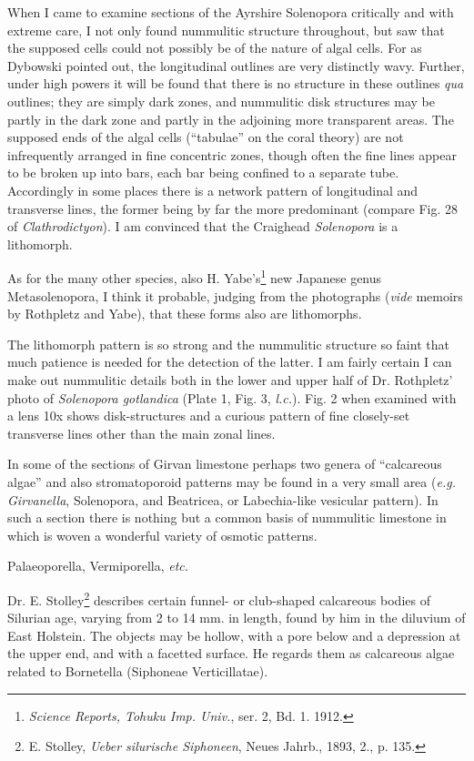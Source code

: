 \documentclass[a4paper, 12pt, oneside]{article}
\begin{document}
When I came to examine sections of the Ayrshire Solenopora critically and with extreme care, I not only found nummulitic structure throughout, but saw that the supposed cells could not possibly be of the nature of algal cells. For as Dybowski pointed out, the longitudinal outlines are very distinctly wavy. Further, under high powers it will be found that there is no structure in these outlines \emph{qua} outlines; they are simply dark zones, and nummulitic disk structures may be partly in the dark zone and partly in the adjoining more transparent areas. The supposed ends of the algal cells (``tabulae'' on the coral theory) are not infrequently arranged in fine concentric zones, though often the fine lines appear to be broken up into bars, each bar being confined to a separate tube. Accordingly in some places there is a network pattern of longitudinal and transverse lines, the former being by far the more predominant (compare Fig. 28 of \emph{Clathrodictyon}). I am convinced that the Craighead \emph{Solenopora} is a lithomorph.

As for the many other species, also H. Yabe's\footnote{\emph{Science Reports, Tohuku Imp. Univ.}, ser. 2, Bd. 1. 1912.} new Japanese genus Metasolenopora, I think it probable, judging from the photographs (\emph{vide} memoirs by Rothpletz and Yabe), that these forms also are lithomorphs.

The lithomorph pattern is so strong and the nummulitic structure so faint that much patience is needed for the detection of the latter. I am fairly certain I can make out nummulitic details both in the lower and upper half of Dr. Rothpletz' photo of \emph{Solenopora gotlandica} (Plate 1, Fig. 3, \emph{l.c.}). Fig. 2 when examined with a lens 10x shows disk-structures and a curious pattern of fine closely-set transverse lines other than the main zonal lines.

In some of the sections of Girvan limestone perhaps two genera of ``calcareous algae'' and also stromatoporoid patterns may be found in a very small area (\emph{e.g.} \emph{Girvanella}, Solenopora, and Beatricea, or Labechia-like vesicular pattern). In such a section there is nothing but a common basis of nummulitic limestone in which is woven a wonderful variety of osmotic patterns.

Palaeoporella, Vermiporella, \emph{etc.}

Dr. E. Stolley\footnote{E. Stolley, \emph{Ueber silurische Siphoneen}, Neues Jahrb., 1893, 2., p. 135.} describes certain funnel- or club-shaped calcareous bodies of Silurian age, varying from 2 to 14 mm. in length, found by him in the diluvium of East Holstein. The objects may be hollow, with a pore below and a depression at the upper end, and with a facetted surface. He regards them as calcareous algae related to Bornetella (Siphoneae Verticillatae).
\end{document}
